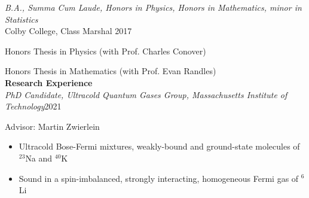 \documentclass[10pt]{article}
\begin{document}
\noindent \textit{B.A., Summa Cum Laude, Honors in Physics, Honors in Mathematics, minor in Statistics}\\
Colby College,  Class Marshal \hfill 2017

\vspace{5pt}
Honors Thesis in Physics (with Prof. Charles Conover)

Honors Thesis in Mathematics (with Prof. Evan Randles)\\

	







\noindent \large{\textbf{{Research Experience}}}   \normalsize \\  

\vspace{-5pt}
\noindent \textit{PhD Candidate, Ultracold Quantum Gases Group, Massachusetts Institute of Technology}\hfill 2021\textendash

\vspace{2pt}
Advisor: Martin Zwierlein
\vspace{-5pt}
\begin{itemize}
	\setlength\itemsep{-4pt}
	\item Ultracold Bose-Fermi mixtures, weakly-bound and ground-state molecules of $^{23}$Na and $^{40}$K
	\item Sound in a spin-imbalanced, strongly interacting, homogeneous Fermi gas of $^{6}$Li
\end{itemize}
\end{document}
